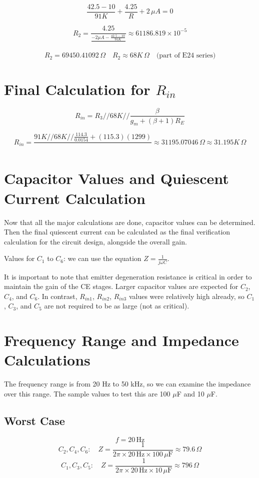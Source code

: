 \[
\frac{42.5 - 10}{91K} + \frac{4.25}{R} + 2 \, \mu A = 0
\]

\[
R_2 = \frac{4.25}{\frac{-2\mu A - \frac{42.5-10}{91K}}{}} \approx 61186.819 \times 10^{-5}
\]

\[
R_2 = 69450.41092 \, \Omega \quad R_2 \approx 68K \, \Omega \quad \text{(part of E24 series)}
\]

\section{Final Calculation for \(R_{in}\)}

\[
R_{in} = R_3 // 68K // \frac{\beta}{g_m + (\beta + 1)R_E}
\]

\[
R_{in} = \frac{91K // 68K // \frac{114.3}{0.0154} + (115.3)(1299)}{} \approx 31195.07046 \, \Omega \approx 31.195K \, \Omega
\]

\section{Capacitor Values and Quiescent Current Calculation}

Now that all the major calculations are done, capacitor values can be determined. Then the final quiescent current can be calculated as the final verification calculation for the circuit design, alongside the overall gain.

Values for \(C_1\) to \(C_6\): we can use the equation \(Z = \frac{1}{j\omega C}\).

It is important to note that emitter degeneration resistance is critical in order to maintain the gain of the CE stages. Larger capacitor values are expected for \(C_2\), \(C_4\), and \(C_6\). In contrast, \(R_{in1}\), \(R_{in2}\), \(R_{in3}\) values were relatively high already, so \(C_1\), \(C_3\), and \(C_5\) are not required to be as large (not as critical).

\section{Frequency Range and Impedance Calculations}

The frequency range is from 20 Hz to 50 kHz, so we can examine the impedance over this range. The sample values to test this are 100 \(\mu\)F and 10 \(\mu\)F.

\subsection{Worst Case}
\[
f = 20 \, \text{Hz}
\]
\[
C_2, C_4, C_6: \quad Z = \frac{1}{2\pi \times 20 \, \text{Hz} \times 100 \, \mu\text{F}} \approx 79.6 \, \Omega
\]
\[
C_1, C_3, C_5: \quad Z = \frac{1}{2\pi \times 20 \, \text{Hz} \times 10 \, \mu\text{F}} \approx 796 \, \Omega
\]

